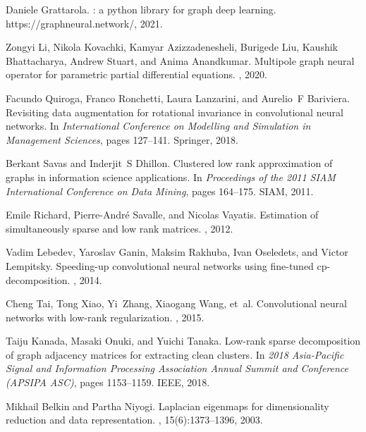 \documentclass[12pt,reqno]{article}
\begin{document}
\begin{thebibliography}{10}
Daniele Grattarola.
: a python library for graph deep learning.
\newblock https://graphneural.network/, 2021.


Zongyi Li, Nikola Kovachki, Kamyar Azizzadenesheli, Burigede Liu, Kaushik
Bhattacharya, Andrew Stuart, and Anima Anandkumar.
\newblock Multipole graph neural operator for parametric partial differential
equations.
, 2020.

Facundo Quiroga, Franco Ronchetti, Laura Lanzarini, and Aurelio~F Bariviera.
\newblock Revisiting data augmentation for rotational invariance in
convolutional neural networks.
\newblock In {\em International Conference on Modelling and Simulation in
Management Sciences}, pages 127--141. Springer, 2018.

Berkant Savas and Inderjit~S Dhillon.
\newblock Clustered low rank approximation of graphs in information science
applications.
\newblock In {\em Proceedings of the 2011 SIAM International Conference on Data
Mining}, pages 164--175. SIAM, 2011.

Emile Richard, Pierre-Andr{\'e} Savalle, and Nicolas Vayatis.
\newblock Estimation of simultaneously sparse and low rank matrices.
, 2012.

Vadim Lebedev, Yaroslav Ganin, Maksim Rakhuba, Ivan Oseledets, and Victor
Lempitsky.
\newblock Speeding-up convolutional neural networks using fine-tuned
cp-decomposition.
, 2014.

Cheng Tai, Tong Xiao, Yi~Zhang, Xiaogang Wang, et~al.
\newblock Convolutional neural networks with low-rank regularization.
, 2015.

Taiju Kanada, Masaki Onuki, and Yuichi Tanaka.
\newblock Low-rank sparse decomposition of graph adjacency matrices for
extracting clean clusters.
\newblock In {\em 2018 Asia-Pacific Signal and Information Processing
Association Annual Summit and Conference (APSIPA ASC)}, pages 1153--1159.
{IEEE}, 2018.

Mikhail Belkin and Partha Niyogi.
\newblock Laplacian eigenmaps for dimensionality reduction and data
representation.
, 15(6):1373--1396, 2003.


\end{thebibliography}
\end{document}
